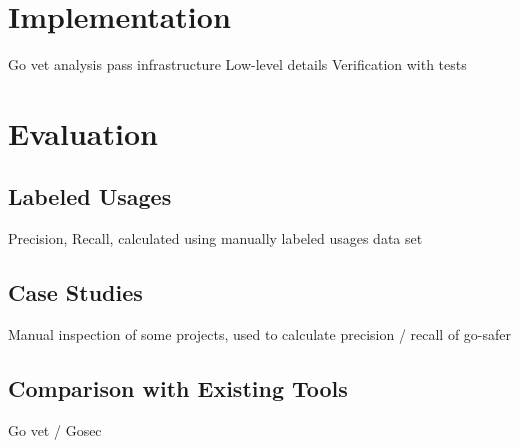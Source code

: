 
\section{Implementation}\label{sec:go-safer:implementation}



Go vet analysis pass infrastructure
Low-level details
Verification with tests



\section{Evaluation}\label{sec:go-safer:evaluation}



\subsection{Labeled Usages}\label{subsec:go-safer:evaluation:labeled-usages}

Precision, Recall, calculated using manually labeled usages data set





\subsection{Case Studies}\label{subsec:go-safer:evaluation:case-studies}

Manual inspection of some projects, used to calculate precision / recall of go-safer





\subsection{Comparison with Existing Tools}\label{subsec:go-safer:evaluation:linters-comparison}

Go vet / Gosec
